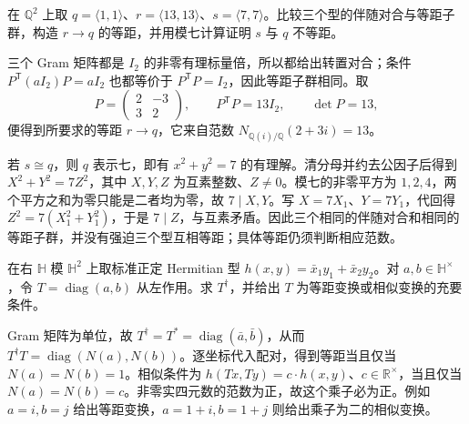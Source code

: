 \begin{exercise}\label{b2:ex:B-similarity-not-isometry}
	在 \(\mathbb Q^2\) 上取 \(q=\langle1,1\rangle\)、\(r=\langle13,13\rangle\)、\(s=\langle7,7\rangle\)。比较三个型的伴随对合与等距子群，构造 \(r\to q\) 的等距，并用模七计算证明 \(s\) 与 \(q\) 不等距。
\end{exercise}
\begin{solution}
	三个 Gram 矩阵都是 \(I_2\) 的非零有理标量倍，所以都给出转置对合；条件 \(P^{\mathsf T}(aI_2)P=aI_2\) 也都等价于 \(P^{\mathsf T}P=I_2\)，因此等距子群相同。取
	\[
		P=\begin{pmatrix}2&-3\\3&2\end{pmatrix},\qquad
		P^{\mathsf T}P=13I_2,\qquad\det P=13,
	\]
	便得到所要求的等距 \(r\to q\)，它来自范数 \(N_{\mathbb Q(i)/\mathbb Q}(2+3i)=13\)。

	若 \(s\cong q\)，则 \(q\) 表示七，即有 \(x^2+y^2=7\) 的有理解。清分母并约去公因子后得到 \(X^2+Y^2=7Z^2\)，其中 \(X,Y,Z\) 为互素整数、\(Z\ne0\)。模七的非零平方为 \(1,2,4\)，两个平方之和为零只能是二者均为零，故 \(7\mid X,Y\)。写 \(X=7X_1\)、\(Y=7Y_1\)，代回得 \(Z^2=7(X_1^2+Y_1^2)\)，于是 \(7\mid Z\)，与互素矛盾。因此三个相同的伴随对合和相同的等距子群，并没有强迫三个型互相等距；具体等距仍须判断相应范数。
\end{solution}

\begin{exercise}\label{b2:ex:B-quaternion-hermitian-isometries}
	在右 \(\mathbb H\) 模 \(\mathbb H^2\) 上取标准正定 Hermitian 型 \(h(x,y)=\bar x_1y_1+\bar x_2y_2\)。对 \(a,b\in\mathbb H^\times\)，令 \(T=\operatorname{diag}(a,b)\) 从左作用。求 \(T^\dagger\)，并给出 \(T\) 为等距变换或相似变换的充要条件。
\end{exercise}
\begin{solution}
	Gram 矩阵为单位，故 \(T^\dagger=T^*=\operatorname{diag}(\bar a,\bar b)\)，从而 \(T^\dagger T=\operatorname{diag}(N(a),N(b))\)。逐坐标代入配对，得到等距当且仅当 \(N(a)=N(b)=1\)。相似条件为 \(h(Tx,Ty)=c\cdot h(x,y)\)、\(c\in\mathbb R^\times\)，当且仅当 \(N(a)=N(b)=c\)。非零实四元数的范数为正，故这个乘子必为正。例如 \(a=i,b=j\) 给出等距变换，\(a=1+i,b=1+j\) 则给出乘子为二的相似变换。
\end{solution}
